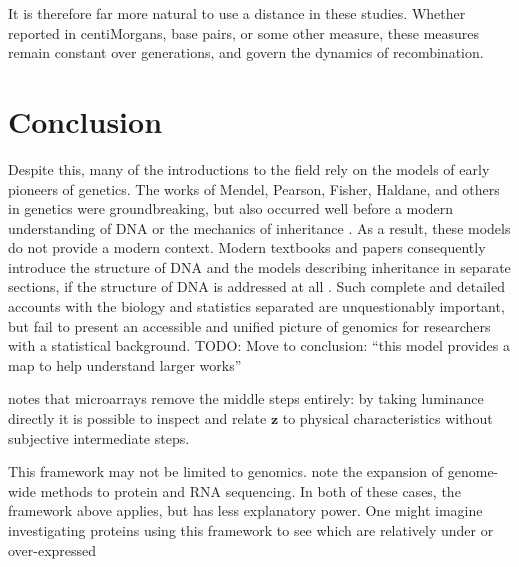 \documentclass{article}
\newcommand{\ve}[1]{\mathbf{#1}}           %
\newcommand{\TODO}[1]{{\color{brickred} TODO:  {#1}}}
\begin{document}
It is therefore far more natural to use a distance in these studies. Whether reported in centiMorgans, base pairs, or some other measure, these measures remain constant over generations, and govern the dynamics of recombination.

\section{Conclusion} \label{sec:conclusion}

Despite this, many of the introductions to the field rely on the models of early pioneers of genetics. The works of Mendel, Pearson, Fisher, Haldane, and others in genetics were groundbreaking, but also occurred well before a modern understanding of DNA or the mechanics of inheritance \cite{visschergoddard2019}. As a result, these models do not provide a modern context. Modern textbooks and papers consequently introduce the structure of DNA and the models describing inheritance in separate sections, if the structure of DNA is addressed at all \cite{crowkimura1970intro, siegmundyakir2007, xu2013principles, liu1998statistical}. Such complete and detailed accounts with the biology and statistics separated are unquestionably important, but fail to present an accessible and unified picture of genomics for researchers with a statistical background. \TODO{Move to conclusion: ``this model provides a map to help understand larger works''}

\cite{laframboise2009} notes that microarrays remove the middle steps entirely: by taking luminance directly it is possible to inspect and relate $\ve{z}$ to physical characteristics without subjective intermediate steps.

This framework may not be limited to genomics. \cite{hasinetal2017multi} note the expansion of genome-wide methods to protein and RNA sequencing. In both of these cases, the framework above applies, but has less explanatory power. One might imagine investigating proteins using this framework to see which are relatively under or over-expressed


\renewcommand*{\bibname}{References} %

\end{document}
